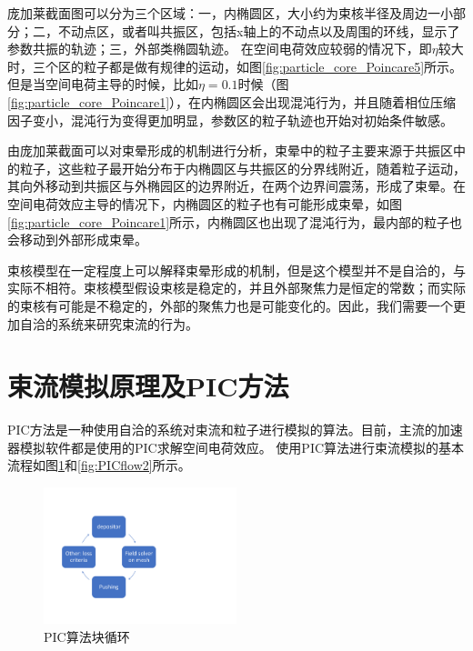 庞加莱截面图可以分为三个区域：一，内椭圆区，大小约为束核半径及周边一小部分；二，不动点区，或者叫共振区，包括x轴上的不动点以及周围的环线，显示了参数共振的轨迹；三，外部类椭圆轨迹。
在空间电荷效应较弱的情况下，即$\eta$较大时，三个区的粒子都是做有规律的运动，如图\ref{fig:particle_core_Poincare5}所示。但是当空间电荷主导的时候，比如$\eta=0.1$时候（图\ref{fig:particle_core_Poincare1}），在内椭圆区会出现混沌行为，并且随着相位压缩因子变小，混沌行为变得更加明显，参数区的粒子轨迹也开始对初始条件敏感。

由庞加莱截面可以对束晕形成的机制进行分析，束晕中的粒子主要来源于共振区中的粒子，这些粒子最开始分布于内椭圆区与共振区的分界线附近，随着粒子运动，其向外移动到共振区与外椭园区的边界附近，在两个边界间震荡，形成了束晕。在空间电荷效应主导的情况下，内椭圆区的粒子也有可能形成束晕，如图\ref{fig:particle_core_Poincare1}所示，内椭圆区也出现了混沌行为，最内部的粒子也会移动到外部形成束晕。

束核模型在一定程度上可以解释束晕形成的机制，但是这个模型并不是自洽的，与实际不相符。束核模型假设束核是稳定的，并且外部聚焦力是恒定的常数；而实际的束核有可能是不稳定的，外部的聚焦力也是可能变化的。因此，我们需要一个更加自洽的系统来研究束流的行为。

\section{束流模拟原理及PIC方法}    \label{section:PIC_algorithm}
PIC方法是一种使用自洽的系统对束流和粒子进行模拟的算法。目前，主流的加速器模拟软件都是使用的PIC求解空间电荷效应\cite{PIC_Birdsall1991, PIC_friedman1992, PIC_ji2000, PIC_ji2004, PIC_Amundson2006229, PIC_tracewin2014, PIC_beampath2005}。
使用PIC算法进行束流模拟的基本流程如图\ref{fig:PICflow1}和\ref{fig:PICflow2}所示。

\begin{figure}[!tbh]
  \centering
    \includegraphics[width=0.5\textwidth]{Img/3_1_PIC.pdf}
    \caption{PIC算法块循环}
    \label{fig:PICflow1}
\end{figure}

